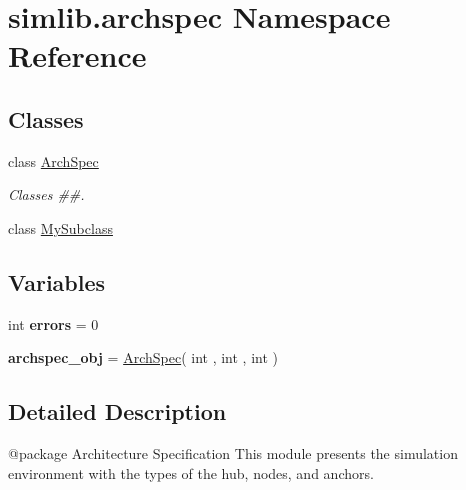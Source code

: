 \hypertarget{namespacesimlib_1_1archspec}{}\section{simlib.\+archspec Namespace Reference}
\label{namespacesimlib_1_1archspec}
\subsection*{Classes}
\begin{DoxyCompactItemize}
\item 
class \mbox{\hyperlink{classsimlib_1_1archspec_1_1_arch_spec}{Arch\+Spec}}
\begin{DoxyCompactList}\small\item\em Classes \#\#. \end{DoxyCompactList}\item 
class \mbox{\hyperlink{classsimlib_1_1archspec_1_1_my_subclass}{My\+Subclass}}
\end{DoxyCompactItemize}
\subsection*{Variables}
\begin{DoxyCompactItemize}
\item 
\mbox{\label{namespacesimlib_1_1archspec_a417dd2991c99643d042aec6e1c95039d}} 
int {\bfseries errors} = 0
\item 
\mbox{\label{namespacesimlib_1_1archspec_a27bb5093b53649de1394d2ba20db9a51}} 
{\bfseries archspec\+\_\+obj} = \mbox{\hyperlink{classsimlib_1_1archspec_1_1_arch_spec}{Arch\+Spec}}( int , int , int )
\end{DoxyCompactItemize}


\subsection{Detailed Description}
\begin{DoxyVerb}@package Architecture Specification
This module presents the simulation environment with the types of the hub, nodes, and
anchors.
\end{DoxyVerb}
 